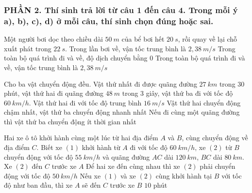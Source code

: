 \subsubsection*{PHẦN 2. Thí sinh trả lời từ câu 1 đến câu 4. Trong mỗi ý a), b), c), d) ở mỗi câu, thí sinh chọn đúng hoặc sai.}
\setcounter{ex}{0}
\begin{ex}%
Một người bơi dọc theo chiều dài $50\ m$ của bể bơi hết $20\ s$, rồi quay về lại chỗ xuất phát trong $22\ s$.
{Trong lần bơi về, vận tốc trung bình là $2,38\ m/s$}
{\True Trong toàn bộ quá trình đi và về, độ dịch chuyển bằng $0$}
{Trong toàn bộ quá trình đi và về, vận tốc trung bình là $2,38\ m/s$}
\loigiai{ 
\begin{itemchoice}
\itemch
\itemch
\itemch
\itemch
\end{itemchoice}
}
\end{ex}
\begin{ex}%
Cho ba vật chuyển động đều. Vật thứ nhất đi được quãng đường $27\ km$ trong $30$ phút, vật thứ hai đi quãng đường $48\ m$ trong $3$ giây, vật thứ ba đi với tốc độ $60\ km/h$.
{\True Vật thứ hai đi với tốc độ trung bình $16 \ m/s$} 
{Vật thứ hai chuyển động chậm nhất, vật thứ ba chuyển động nhanh nhất} 
{\True Nếu đi cùng một quãng đường thì vật thứ ba chuyển động ít thời gian nhất} 
\loigiai{ 
\begin{itemchoice}
\itemch
\itemch
\itemch
\itemch
\end{itemchoice}
}
\end{ex}
\begin{ex}%
Hai xe ô tô khởi hành cùng một lúc từ hai địa điểm $A$ và $B$, cùng chuyển động về địa điểm $C$. Biết xe $(1)$ khởi hành từ $A$ đi với tốc độ $60 \ km/h$, xe $(2)$ từ $B$ chuyển động với tốc độ $55 \ km/h$ và quãng đường $AC$ dài $120 \ km$, $BC$ dài $80\ km$.
{\True Xe $(2)$ đến $C$ trước xe $A$} 
{Để hai xe đến cùng nhau thì xe $(2)$ phải chuyển động với tốc độ $50 \ km/h$} 
{Nếu xe $(1)$ và xe $(2)$ cùng khởi hành tại $B$ với tốc độ như ban đầu, thì xe $A$ sẽ đến $C$ trước xe $B$ $10$ phút} 
\loigiai{ 
\begin{itemchoice}
\itemch
\itemch
\itemch
\itemch
\end{itemchoice}
}
\end{ex}
